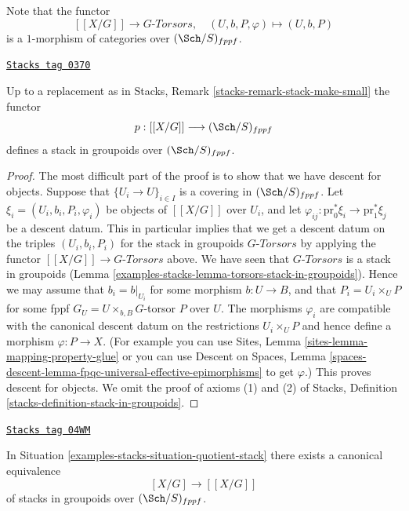 \medskip\noindent
Note that the functor
$$
[[X/G]] \longrightarrow G\textit{-Torsors},
\quad
(U, b, P, \varphi) \longmapsto (U, b, P)
$$
is a $1$-morphism of categories over $(\Sch/S)_{fppf}$.

\begin{lemma}
\label{examples-stacks-lemma-group-quotient-stack-in-groupoids}
\href{https://stacks.math.columbia.edu/tag/0370}{\texttt{Stacks tag 0370}}

Up to a replacement as in
Stacks, Remark \ref{stacks-remark-stack-make-small}
the functor
$$
p : [[X/G]] \longrightarrow (\Sch/S)_{fppf}
$$
defines a stack in groupoids over $(\Sch/S)_{fppf}$.
\end{lemma}

\begin{proof}
The most difficult part of the proof is to show that we have descent for
objects. Suppose that $\{U_i \to U\}_{i \in I}$ is a covering in
$(\Sch/S)_{fppf}$. Let
$\xi_i = (U_i, b_i, P_i, \varphi_i)$ be objects of $[[X/G]]$ over $U_i$,
and let $\varphi_{ij} : \text{pr}_0^*\xi_i \to \text{pr}_1^*\xi_j$
be a descent datum. This in particular implies that we get a descent
datum on the triples $(U_i, b_i, P_i)$ for the stack in groupoids
$G\textit{-Torsors}$ by applying the functor
$[[X/G]] \to G\textit{-Torsors}$ above. We have seen that
$G\textit{-Torsors}$ is a stack in groupoids
(Lemma \ref{examples-stacks-lemma-torsors-stack-in-groupoids}).
Hence we may assume that $b_i = b|_{U_i}$ for some morphism $b : U \to B$, and
that $P_i = U_i \times_U P$ for some fppf $G_U = U \times_{b, B} G$-torsor
$P$ over $U$. The morphisms $\varphi_i$ are compatible
with the canonical descent datum on the restrictions $U_i \times_U P$
and hence define a morphism $\varphi : P \to X$. (For example you
can use
Sites, Lemma \ref{sites-lemma-mapping-property-glue}
or you can use
Descent on Spaces,
Lemma \ref{spaces-descent-lemma-fpqc-universal-effective-epimorphisms}
to get $\varphi$.)
This proves descent for objects.
We omit the proof of axioms (1) and (2) of
Stacks, Definition \ref{stacks-definition-stack-in-groupoids}.
\end{proof}

\begin{proposition}
\label{examples-stacks-proposition-equal-quotient-stacks}
\href{https://stacks.math.columbia.edu/tag/04WM}{\texttt{Stacks tag 04WM}}

In
Situation \ref{examples-stacks-situation-quotient-stack}
there exists a canonical equivalence
$$
[X/G] \longrightarrow [[X/G]]
$$
of stacks in groupoids over $(\Sch/S)_{fppf}$.
\end{proposition}

